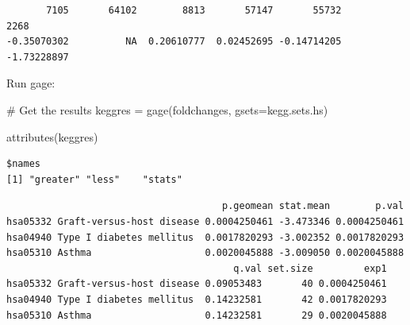 \documentclass[
  letterpaper,
  DIV=11,
  numbers=noendperiod]{scrartcl}
\newenvironment{Shaded}{\begin{snugshade}}{\end{snugshade}}
\newcommand{\AttributeTok}[1]{\textcolor[rgb]{0.40,0.45,0.13}{#1}}
\newcommand{\CommentTok}[1]{\textcolor[rgb]{0.37,0.37,0.37}{#1}}
\newcommand{\DecValTok}[1]{\textcolor[rgb]{0.68,0.00,0.00}{#1}}
\newcommand{\FunctionTok}[1]{\textcolor[rgb]{0.28,0.35,0.67}{#1}}
\newcommand{\NormalTok}[1]{\textcolor[rgb]{0.00,0.23,0.31}{#1}}
\newcommand{\OtherTok}[1]{\textcolor[rgb]{0.00,0.23,0.31}{#1}}
\newcommand{\SpecialCharTok}[1]{\textcolor[rgb]{0.37,0.37,0.37}{#1}}
\begin{document}
\begin{Shaded}
\end{Shaded}

\begin{verbatim}
       7105       64102        8813       57147       55732        2268 
-0.35070302          NA  0.20610777  0.02452695 -0.14714205 -1.73228897 
\end{verbatim}

Run gage:

\begin{Shaded}
\begin{Highlighting}[]
\CommentTok{\# Get the results}
\NormalTok{keggres }\OtherTok{=} \FunctionTok{gage}\NormalTok{(foldchanges, }\AttributeTok{gsets=}\NormalTok{kegg.sets.hs)}
\end{Highlighting}
\end{Shaded}

\begin{Shaded}
\begin{Highlighting}[]
\FunctionTok{attributes}\NormalTok{(keggres)}
\end{Highlighting}
\end{Shaded}

\begin{verbatim}
$names
[1] "greater" "less"    "stats"  
\end{verbatim}

\begin{Shaded}
\end{Shaded}

\begin{verbatim}
                                      p.geomean stat.mean        p.val
hsa05332 Graft-versus-host disease 0.0004250461 -3.473346 0.0004250461
hsa04940 Type I diabetes mellitus  0.0017820293 -3.002352 0.0017820293
hsa05310 Asthma                    0.0020045888 -3.009050 0.0020045888
                                        q.val set.size         exp1
hsa05332 Graft-versus-host disease 0.09053483       40 0.0004250461
hsa04940 Type I diabetes mellitus  0.14232581       42 0.0017820293
hsa05310 Asthma                    0.14232581       29 0.0020045888
\end{verbatim}
\end{document}
